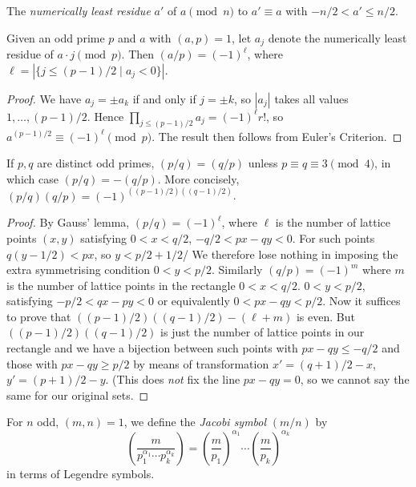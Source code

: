 \documentclass[a4paper, 10pt]{amsart}
\begin{document}
\begin{definition}
    The \emph{numerically least residue} $a'$ of $a \pmod n$ to $a' \equiv a$ with $-n/2 < a' \leq n/2$. 
\end{definition}

\begin{theorem}
Given an odd prime $p$ and $a$ with $(a, p) = 1$, let $a_j$ denote the numerically least residue of $a \cdot j \pmod{p}$. Then $(a/p) = (-1)^\ell$, where $\ell = |\{j \leq (p-1)/2 \mid a_j < 0\}|$.
\end{theorem}
\begin{proof}
    We have $a_j = \pm a_k$ if and only if $j = \pm k$, so $|a_j|$ takes all values $1, \dots, (p-1)/2$. Hence $\prod_{j \leq (p-1)/2} a_j = (-1)^\ell r!$, so $a^{(p-1)/2} \equiv (-1)^\ell \pmod{p}$. The result then follows from Euler's Criterion.
\end{proof}

\begin{theorem}
If $p, q$ are distinct odd primes, $(p/q) = (q/p)$ unless $p \equiv q \equiv 3 \pmod{4}$, in which case $(p/q) = -(q/p)$. More concisely, $(p/q)(q/p) = (-1)^{((p-1)/2)((q-1)/2)}$.
\end{theorem}
\begin{proof}
    By Gauss' lemma, $(p/q) = (-1)^\ell$, where $\ell$ is the number of lattice points $(x, y)$ satisfying $0 < x< q/2$, $-q/2 < px - qy < 0$. For such points $q(y - 1/2) < px$, so $y < p/2 + 1/2$/ We therefore lose nothing in imposing the extra symmetrising condition $0 < y < p/2$. Similarly $(q/p) = (-1)^m$ where $m$ is the number of lattice points in the rectangle $0 < x < q/2$. $0 < y < p/2$, satisfying $-p/2 < qx - py < 0$ or equivalently $0 < px - qy < p/2$. Now it suffices to prove that $((p-1)/2)((q-1)/2) - (\ell + m)$ is even. But $((p-1)/2)((q-1)/2)$ is just the number of lattice points in our rectangle and we have a bijection between such points with $px - qy \leq -q/2$ and those with $px - qy \geq p/2$ by means of transformation $x' = (q+1)/2 - x$, $y' = (p + 1)/2 - y$. (This does \emph{not} fix the line $px - qy = 0$, so we cannot say the same for our original sets.
\end{proof}

\begin{definition}
    For $n$ odd, $(m, n) = 1$, we define the \emph{Jacobi symbol} $(m/n)$ by 
    $$
    \left(\frac{m}{p_1^{\alpha_1} \cdots p_k^{\alpha_k}}\right)
    = \left(\frac{m}{p_1}\right)^{\alpha_1} \cdots \left(\frac{m}{p_k}\right)^{\alpha_k}
    $$
    in terms of Legendre symbols.
\end{definition}
\end{document}

